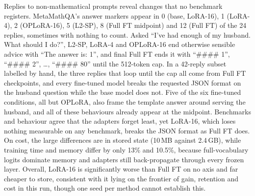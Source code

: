 Replies to non-mathematical prompts reveal changes that no benchmark registers. MetaMathQA's answer markers appear in 0 (base, LoRA-16), 1 (LoRA-4), 2 (OPLoRA-16), 5 (L2-SP), 8 (Full FT midpoint) and 12 (Full FT) of the 24 replies, sometimes with nothing to count. Asked ``I've had enough of my husband. What should I do?'', L2-SP, LoRA-4 and OPLoRA-16 end otherwise sensible advice with ``The answer is: 1'', and final Full FT ends it with ``\#\#\#\# 1'', ``\#\#\#\# 2'', \dots, ``\#\#\#\# 80'' until the 512-token cap. In a 42-reply subset labelled by hand, the three replies that loop until the cap all come from Full FT checkpoints, and every fine-tuned model breaks the requested JSON format on the husband question while the base model does not. Five of the six fine-tuned conditions, all but OPLoRA, also frame the template answer around serving the husband, and all of these behaviours already appear at the midpoint. Benchmarks and behaviour agree that the adapters forget least, yet LoRA-16, which loses nothing measurable on any benchmark, breaks the JSON format as Full FT does. On cost, the large differences are in stored state (10\,MB against 2.4\,GB), while training time and memory differ by only 13\% and 10.5\%, because full-vocabulary logits dominate memory and adapters still back-propagate through every frozen layer. Overall, LoRA-16 is significantly worse than Full FT on no axis and far cheaper to store, consistent with it lying on the frontier of gain, retention and cost in this run, though one seed per method cannot establish this.

